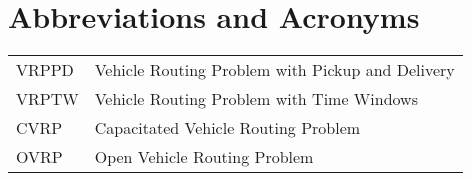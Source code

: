 \chapter*{Abbreviations and Acronyms}


\noindent
\begin{longtable}{@{}p{}p{}@{}}
VRPPD & Vehicle Routing Problem with Pickup and Delivery \\
VRPTW & Vehicle Routing Problem with Time Windows \\ 
CVRP & Capacitated Vehicle Routing Problem \\ 
OVRP & Open Vehicle Routing Problem \\

\end{longtable}
